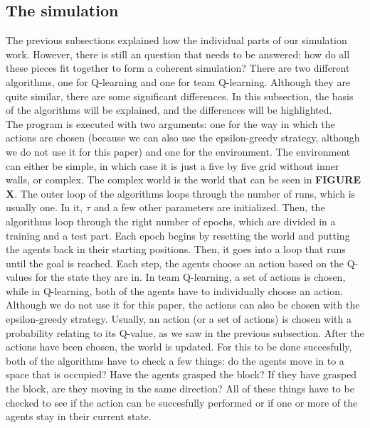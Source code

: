 \subsection{The simulation}
The previous subsections explained how the individual parts of our simulation work. However, there is still an question that needs to be answered: how do all these pieces fit together to form a coherent simulation? There are two different algorithms, one for Q-learning and one for team Q-learning. Although they are quite similar, there are some significant differences. In this subsection, the basis of the algorithms will be explained, and the differences will be highlighted.\\
The program is executed with two arguments: one for the way in which the actions are chosen (because we can also use the epsilon-greedy strategy, although we do not use it for this paper) and one for the environment. The environment can either be simple, in which case it is just a five by five grid without inner walls, or complex. The complex world is the world that can be seen in \textbf{FIGURE X}. The outer loop of the algorithms loops through the number of runs, which is usually one. In it, $\tau$ and a few other parameters are initialized. Then, the algorithms loop through the right number of epochs, which are divided in a training and a test part. Each epoch begins by resetting the world and putting the agents back in their starting positions. Then, it goes into a loop that runs until the goal is reached. Each step, the agents choose an action based on the Q-values for the state they are in. In team Q-learning, a set of actions is chosen, while in Q-learning, both of the agents have to individually choose an action. Although we do not use it for this paper, the actions can also be chosen with the epsilon-greedy strategy. Usually, an action (or a set of actions) is chosen with a probability relating to its Q-value, as we saw in the previous subsection. After the actions have been chosen, the world is updated. For this to be done succesfully, both of the algorithms have to check a few things: do the agents move in to a space that is occupied? Have the agents grasped the block? If they have grasped the block, are they moving in the same direction? All of these things have to be checked to see if the action can be succesfully performed or if one or more of the agents stay in their current state.